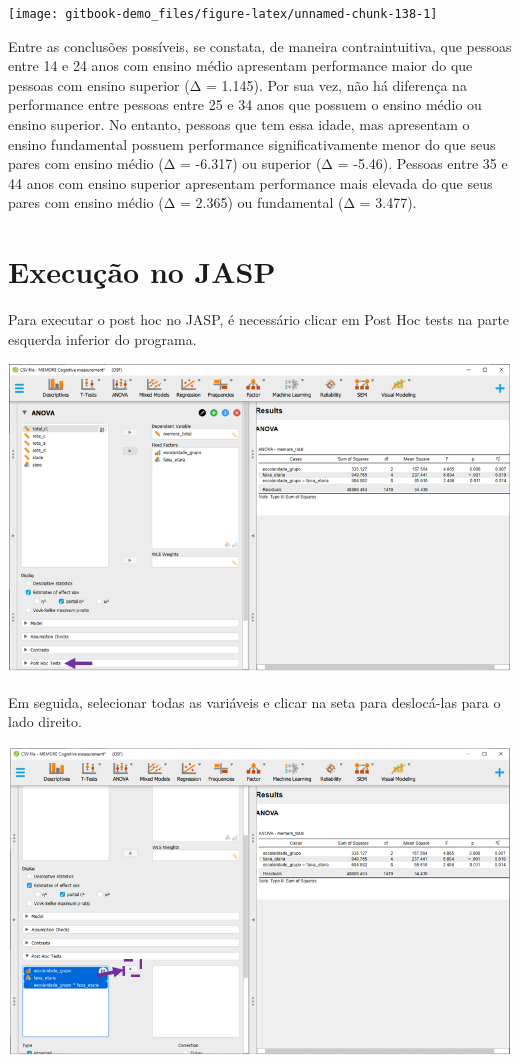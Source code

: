 \documentclass[
]{book}
\begin{document}
\begin{center}\texttt{[image: gitbook-demo\_files/figure-latex/unnamed-chunk-138-1]} \end{center}

Entre as conclusões possíveis, se constata, de maneira contraintuitiva,
que pessoas entre 14 e 24 anos com ensino médio apresentam performance
maior do que pessoas com ensino superior (Δ = 1.145). Por sua vez, não
há diferença na performance entre pessoas entre 25 e 34 anos que possuem
o ensino médio ou ensino superior. No entanto, pessoas que tem essa
idade, mas apresentam o ensino fundamental possuem performance
significativamente menor do que seus pares com ensino médio (Δ = -6.317)
ou superior (Δ = -5.46). Pessoas entre 35 e 44 anos com ensino superior
apresentam performance mais elevada do que seus pares com ensino médio
(Δ = 2.365) ou fundamental (Δ = 3.477).

\hypertarget{execuuxe7uxe3o-no-jasp-10}{%
\section{Execução no JASP}\label{execuuxe7uxe3o-no-jasp-10}}

Para executar o post hoc no JASP, é necessário clicar em Post Hoc tests
na parte esquerda inferior do programa.

\includegraphics{./img/cap_anova_fatorial_posthoc.png}

Em seguida, selecionar todas as variáveis e clicar na seta para
deslocá-las para o lado direito.

\includegraphics{./img/cap_anova_fatorial_posthoc2.png}
\end{document}

